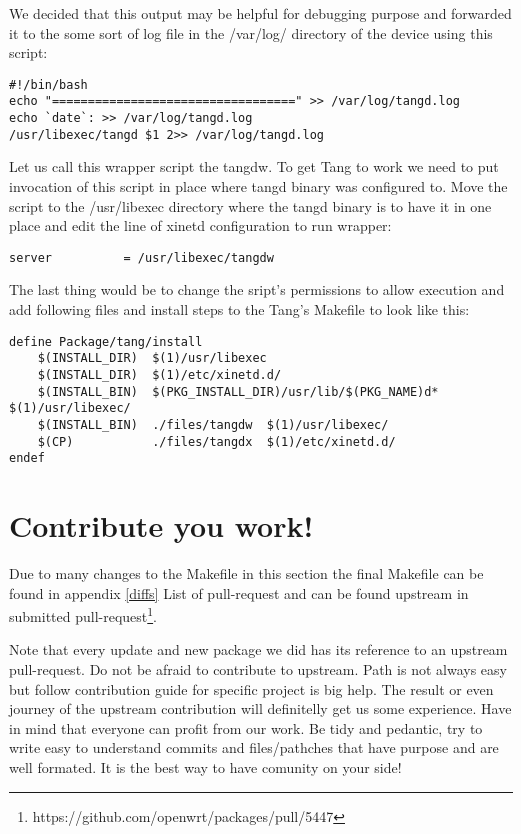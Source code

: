 We decided that this output may be helpful for debugging purpose and forwarded it to the some sort of log file in the /var/log/ directory of the device using this script:
\begin{lstlisting}[columns=fixed,basicstyle=\ttfamily\footnotesize,tabsize=4,backgroundcolor=\color{yellow!10}]
#!/bin/bash
echo "==================================" >> /var/log/tangd.log
echo `date`: >> /var/log/tangd.log
/usr/libexec/tangd $1 2>> /var/log/tangd.log
\end{lstlisting}
Let us call this wrapper script the tangdw.
To get Tang to work we need to put invocation of this script in place where tangd binary was configured to.
Move the script to the /usr/libexec directory where the tangd binary is to have it in one place and edit the line of xinetd configuration to run wrapper:
\begin{lstlisting}[columns=fixed,basicstyle=\ttfamily\footnotesize,tabsize=4,backgroundcolor=\color{yellow!10}]
    server          = /usr/libexec/tangdw
\end{lstlisting}
The last thing would be to change the sript's permissions to allow execution and add following files and install steps to the Tang's Makefile to look like this:
\begin{lstlisting}[columns=fixed,basicstyle=\ttfamily\footnotesize,tabsize=4,backgroundcolor=\color{yellow!10}]
define Package/tang/install
	$(INSTALL_DIR)	$(1)/usr/libexec
	$(INSTALL_DIR)	$(1)/etc/xinetd.d/
	$(INSTALL_BIN)	$(PKG_INSTALL_DIR)/usr/lib/$(PKG_NAME)d*	$(1)/usr/libexec/
	$(INSTALL_BIN)	./files/tangdw	$(1)/usr/libexec/
	$(CP)			./files/tangdx	$(1)/etc/xinetd.d/
endef
\end{lstlisting}



\section{Contribute you work!}
Due to many changes to the Makefile in this section the final Makefile can be found in appendix \ref{diffs} List of pull-request and can be found upstream in submitted pull-request\footnote{https://github.com/openwrt/packages/pull/5447}.

Note that every update and new package we did has its reference to an upstream pull-request.
Do not be afraid to contribute to upstream.
Path is not always easy but follow contribution guide for specific project is big help.
The result or even journey of the upstream contribution will definitelly get us some experience.
Have in mind that everyone can profit from our work.
Be tidy and pedantic, try to write easy to understand commits and files/pathches that have purpose and are well formated.
It is the best way to have comunity on your side!



